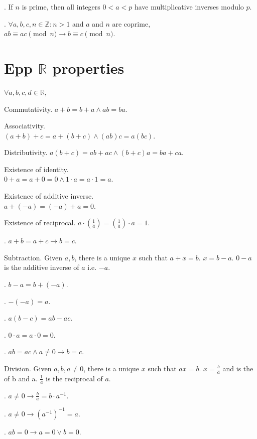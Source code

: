 \documentclass{slnotes}
\begin{document}
. If \(n\) is prime, then all integers \(0 < a < p\) have multiplicative inverses modulo \(p\).

. \(\forall a,b,c,n \in \mathbb{Z} : n > 1\) and \(a\) and \(n\) are coprime, \(ab \equiv ac \pmod n \to b \equiv c \pmod n\).

\chapter{Epp \(\mathbb{R}\) properties}
\(\forall a,b,c,d \in \mathbb{R}\),

 Commutativity. \(a + b = b + a \land ab = ba\).

 Associativity.\\\((a + b) + c = a + (b + c) \land (ab)c = a(bc)\).

 Distributivity. \(a(b + c) = ab + ac \land (b + c)a = ba + ca\).

 Existence of identity.\\\(0 + a = a + 0 = 0 \land 1 \cdot a = a \cdot 1 = a\).

 Existence of additive inverse.\\\(a + (-a) = (-a) + a = 0\).

 Existence of reciprocal. \(a \cdot \left(\frac{1}{a}\right) = \left(\frac{1}{a}\right) \cdot a = 1\).

. \(a + b = a + c \to b = c\).

 Subtraction. Given \(a, b\), there is a unique \(x\) such that \(a + x = b\). \(x = b - a\). \(0 - a\) is the additive inverse of \(a\) i.e. \(-a\).

. \(b - a = b + (-a)\).

. \(-(-a) = a\).

. \(a(b - c) = ab - ac\).

. \(0 \cdot a = a \cdot 0 = 0\).

. \(ab = ac \land a \neq 0 \to b = c\).

 Division. Given \(a, b, a \neq 0\), there is a unique \(x\) such that \(ax = b\). \(x = \frac{b}{a}\) and is the  of b and a. \(\frac{1}{a}\) is the reciprocal of \(a\).

. \(a \neq 0 \to \frac{b}{a} = b \cdot a^{-1}\).

. \(a \neq 0 \to (a^{-1})^{-1} = a\).

. \(ab = 0 \to a = 0 \lor b = 0\).
\end{document}
